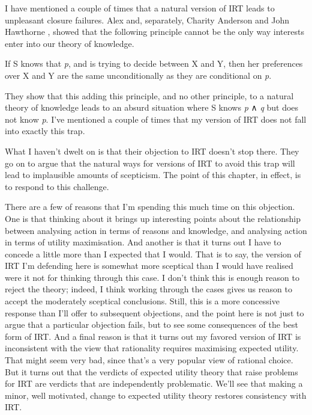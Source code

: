 \documentclass[
  11pt,
]{book}
\providecommand{\tightlist}{%
  \setlength{\itemsep}{0pt}\setlength{\parskip}{0pt}}
\begin{document}
I have mentioned a couple of times that a natural version of IRT leads to unpleasant closure failures. Alex \citet{Zweber2016} and, separately, Charity Anderson and John Hawthorne \citeyearpar{AndersonHawthorne2019a}, showed that the following principle cannot be the only way interests enter into our theory of knowledge.

\begin{description}
\tightlist
\item[Conditional Preferences]
If S knows that \emph{p}, and is trying to decide between X and Y, then her preferences over X and Y are the same unconditionally as they are conditional on \emph{p}.
\end{description}

They show that this adding this principle, and no other principle, to a natural theory of knowledge leads to an absurd situation where S knows \emph{p} ∧ \emph{q} but does not know \emph{p}. I've mentioned a couple of times that my version of IRT does not fall into exactly this trap.

What I haven't dwelt on is that their objection to IRT doesn't stop there. They go on to argue that the natural ways for versions of IRT to avoid this trap will lead to implausible amounts of scepticism. The point of this chapter, in effect, is to respond to this challenge.

There are a few of reasons that I'm spending this much time on this objection. One is that thinking about it brings up interesting points about the relationship between analysing action in terms of reasons and knowledge, and analysing action in terms of utility maximisation. And another is that it turns out I have to concede a little more than I expected that I would. That is to say, the version of IRT I'm defending here is somewhat more sceptical than I would have realised were it not for thinking through this case. I don't think this is enough reason to reject the theory; indeed, I think working through the cases gives us reason to accept the moderately sceptical conclusions. Still, this is a more concessive response than I'll offer to subsequent objections, and the point here is not just to argue that a particular objection fails, but to see some consequences of the best form of IRT. And a final reason is that it turns out my favored version of IRT is inconsistent with the view that rationality requires maximising expected utility. That might seem very bad, since that's a very popular view of rational choice. But it turns out that the verdicts of expected utility theory that raise problems for IRT are verdicts that are independently problematic. We'll see that making a minor, well motivated, change to expected utility theory restores consistency with IRT.
\end{document}
